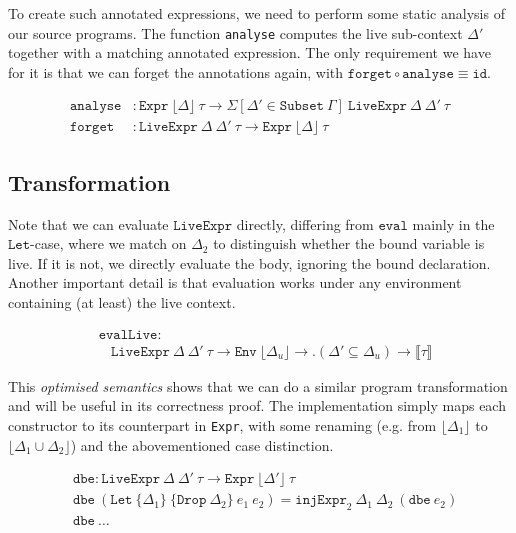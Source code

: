 \documentclass[sigplan,nonacm,screen]{acmart}
\newcommand{\I}[1]{\texttt{#1}\xspace}
\newcommand{\Interpret}[1]{\llbracket #1 \rrbracket\xspace}
\newcommand{\Floor}[1]{\lfloor #1 \rfloor\xspace}
\newcommand{\Existential}[2]{\Sigma[ #1 \in #2 ]\xspace}
\begin{document}
To create such annotated expressions, we need to perform
some static analysis of our source programs.
The function \I{analyse} computes the live sub-context $\Delta'$
together with a matching annotated expression.
The only requirement we have for it is that we can forget the annotations again,
with $\I{forget} \circ \I{analyse} \equiv \I{id}$.

\begin{align*}
  \I{analyse}
    &:  \I{Expr}\ \Floor{\Delta}\ \tau
    \to \Existential{\Delta'}{\I{Subset}\ \Gamma}\ \I{LiveExpr}\ \Delta\ \Delta'\ \tau \\
  \I{forget}
    &:  \I{LiveExpr}\ \Delta\ \Delta'\ \tau
    \to \I{Expr}\ \Floor{\Delta}\ \tau
\end{align*}


\subsection{Transformation}

Note that we can evaluate $\I{LiveExpr}$ directly, differing from $\I{eval}$ mainly
in the $\I{Let}$-case, where we match on $\Delta_2$ to distinguish whether the bound variable is live.
If it is not, we directly evaluate the body, ignoring the bound declaration.
Another important detail is that evaluation works under any environment containing (at least) the live context.

\begin{align*}
  &\I{evalLive} : \\
  &\ \ \ \ \I{LiveExpr}\ \Delta\ \Delta'\ \tau \to  
           \I{Env}\ \Floor{\Delta_u} \to  
           .(\Delta' \subseteq \Delta_u) \to  
           \Interpret{\tau}
\end{align*}

This \emph{optimised semantics} shows that we can do a similar program transformation
and will be useful in its correctness proof.
The implementation simply maps each constructor to its counterpart in \I{Expr},
with some renaming
(e.g. from $\Floor{\Delta_1}$ to $\Floor{\Delta_1 \cup \Delta_2}$)
and the abovementioned case distinction.

\begin{align*}
  &\I{dbe} :  \I{LiveExpr}\ \Delta\ \Delta'\ \tau \to \I{Expr}\ \Floor{\Delta'}\ \tau  \\
  &\I{dbe}\ (\I{Let}\ \{\Delta_1\}\ \{\I{Drop}\ \Delta_2\}\ e_1\ e_2) =
      \I{injExpr}_2\ \Delta_1\ \Delta_2\ (\I{dbe}\ e_2)  \\
  &\I{dbe}\ \ldots
\end{align*}
\end{document}
